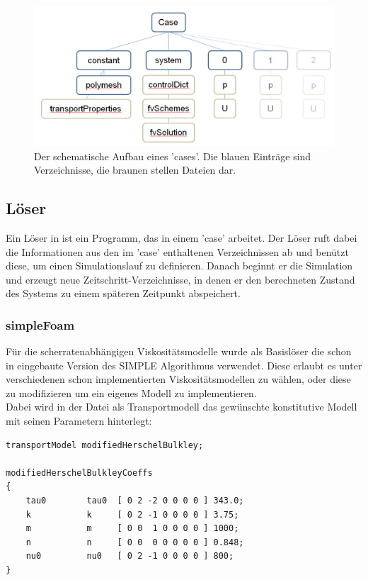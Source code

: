\begin{figure}
    \centering
    \includegraphics[width=\textwidth]{figures/OfCaseSchema.png}
    \caption{Der schematische Aufbau eines \openfoam{} 'cases'. Die blauen Einträge sind Verzeichnisse, die braunen stellen Dateien dar.}
    \label{fig:ofCaseSchema}
\end{figure}
%
\subsection{Löser}
Ein Löser in \openfoam{} ist ein \cpp{} Programm, das in einem 'case' arbeitet. Der Löser ruft dabei die Informationen aus den im 'case' enthaltenen Verzeichnissen ab und benützt diese, um einen Simulationslauf zu definieren. Danach beginnt er die Simulation und erzeugt neue Zeitschritt-Verzeichnisse, in denen er den berechneten Zustand des Systems zu einem späteren Zeitpunkt abspeichert.

\subsubsection{simpleFoam}
Für die scherratenabhängigen Viskositätsmodelle wurde als Basislöser die schon in \openfoam{} eingebaute Version  des SIMPLE Algorithmus verwendet.
Diese erlaubt es unter verschiedenen schon implementierten Viskositätsmodellen zu wählen, oder diese zu modifizieren um ein eigenes Modell zu implementieren.\\
Dabei wird in der Datei  als Transportmodell das gewünschte konstitutive Modell mit seinen Parametern hinterlegt:
%
\begin{lstlisting}
transportModel modifiedHerschelBulkley;

modifiedHerschelBulkleyCoeffs
{
    tau0        tau0  [ 0 2 -2 0 0 0 0 ] 343.0;
    k           k     [ 0 2 -1 0 0 0 0 ] 3.75;
    m           m     [ 0 0  1 0 0 0 0 ] 1000;
    n           n     [ 0 0  0 0 0 0 0 ] 0.848;
    nu0         nu0   [ 0 2 -1 0 0 0 0 ] 800;
}
\end{lstlisting}
%
